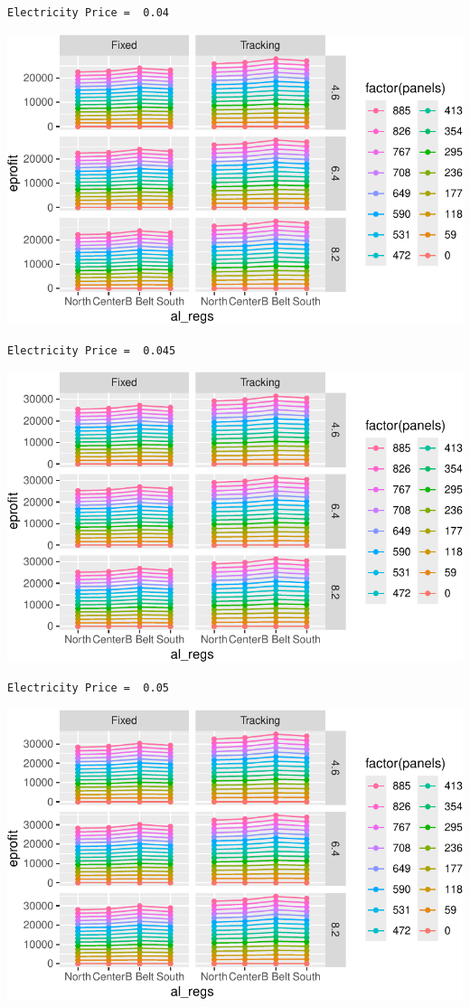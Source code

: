 \documentclass[
  letterpaper,
  DIV=11,
  numbers=noendperiod]{scrartcl}
\begin{document}
\begin{verbatim}
Electricity Price =  0.04
\end{verbatim}

\includegraphics{Simulation_files/figure-pdf/unnamed-chunk-25-7.pdf}

\begin{verbatim}
Electricity Price =  0.045
\end{verbatim}

\includegraphics{Simulation_files/figure-pdf/unnamed-chunk-25-8.pdf}

\begin{verbatim}
Electricity Price =  0.05
\end{verbatim}

\includegraphics{Simulation_files/figure-pdf/unnamed-chunk-25-9.pdf}
\end{document}
